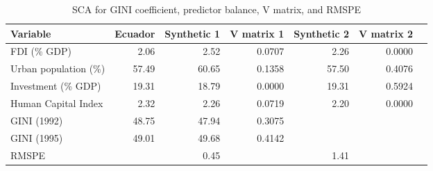 \begin{table}[!h]
\begin{center}
\caption{SCA for GINI coefficient, predictor balance, V matrix, and RMSPE} \label{table:GINI_balance}
\begin{tabular}{l r r r r r r}     \\ \toprule
  Variable              &    Ecuador &  Synthetic 1 & V matrix 1 & Synthetic 2 & V matrix 2 \\
  \midrule 
  FDI (\% GDP)          &       2.06 &         2.52 &     0.0707 &        2.26 &     0.0000 \\
  Urban population (\%) &      57.49 &        60.65 &     0.1358 &       57.50 &     0.4076 \\
  Investment (\% GDP)   &      19.31 &        18.79 &     0.0000 &       19.31 &     0.5924 \\
  Human Capital Index   &       2.32 &         2.26 &     0.0719 &        2.20 &     0.0000 \\
  \midrule
  GINI (1992)           &      48.75 &        47.94 &     0.3075 &             &            \\
  GINI (1995)           &      49.01 &        49.68 &     0.4142 &             &            \\
  \midrule
  RMSPE                 &            &         0.45 &            &        1.41 &            \\
  \bottomrule 
\end{tabular}
\end{center}
\end{table}